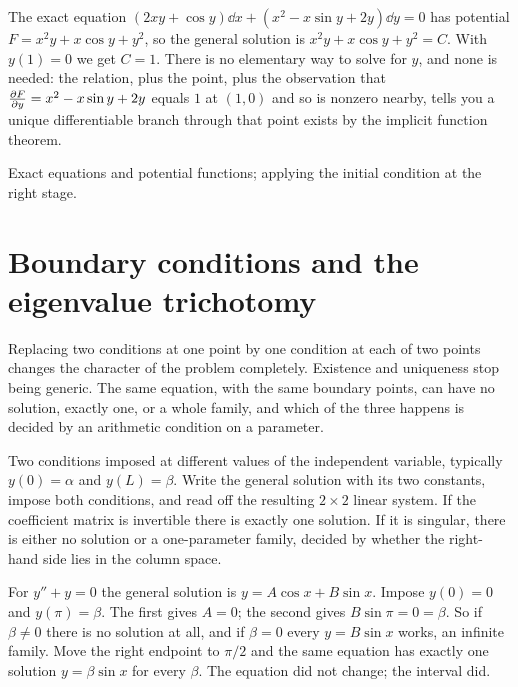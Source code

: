 \begin{worked}
The exact equation $(2xy+\cos y)\dd x+(x^{2}-x\sin y+2y)\dd y=0$ has potential $F=x^{2}y+x\cos y+y^{2}$, so the general solution is $x^{2}y+x\cos y+y^{2}=C$. With $y(1)=0$ we get $C=1$. There is no elementary way to solve for $y$, and none is needed: the relation, plus the point, plus the observation that $\frac{\partial F}{\partial y}=x^{2}-x\sin y+2y$ equals $1$ at $(1,0)$ and so is nonzero nearby, tells you a unique differentiable branch through that point exists by the implicit function theorem.
\end{worked}

\begin{seealsob}Exact equations and potential functions; applying the initial condition at the right stage.\end{seealsob}

\section{Boundary conditions and the eigenvalue trichotomy}

Replacing two conditions at one point by one condition at each of two points changes the character of the problem completely. Existence and uniqueness stop being generic. The same equation, with the same boundary points, can have no solution, exactly one, or a whole family, and which of the three happens is decided by an arithmetic condition on a parameter.

\cue Two conditions imposed at different values of the independent variable, typically $y(0)=\alpha$ and $y(L)=\beta$.
\method Write the general solution with its two constants, impose both conditions, and read off the resulting $2\times2$ linear system. If the coefficient matrix is invertible there is exactly one solution. If it is singular, there is either no solution or a one-parameter family, decided by whether the right-hand side lies in the column space.

\begin{worked}
For $y''+y=0$ the general solution is $y=A\cos x+B\sin x$. Impose $y(0)=0$ and $y(\pi)=\beta$. The first gives $A=0$; the second gives $B\sin\pi=0=\beta$. So if $\beta\neq0$ there is no solution at all, and if $\beta=0$ every $y=B\sin x$ works, an infinite family. Move the right endpoint to $\pi/2$ and the same equation has exactly one solution $y=\beta\sin x$ for every $\beta$. The equation did not change; the interval did.
\end{worked}


